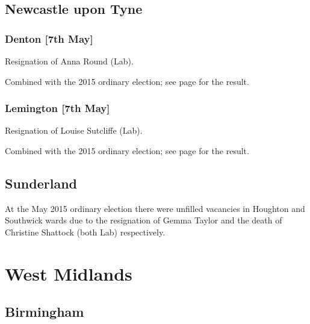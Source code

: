 \documentclass[a4paper,openany]{book}
\begin{document}
\begin{resultsiii}
\subsection*{Newcastle upon Tyne}

\subsubsection*{Denton \hspace*{\fill}\nolinebreak[1]%
\enspace\hspace*{\fill}
[7th May]}


Resignation of Anna Round (Lab).

Combined with the 2015 ordinary election; see page \pageref{DentonNewcastleTyne} for the result.

\subsubsection*{Lemington \hspace*{\fill}\nolinebreak[1]%
\enspace\hspace*{\fill}
[7th May]}


Resignation of Louise Sutcliffe (Lab).

Combined with the 2015 ordinary election; see page \pageref{LemingtonNewcastleTyne} for the result.

\subsection*{Sunderland}

At the May 2015 ordinary election there were unfilled vacancies in Houghton and Southwick wards due to the resignation of Gemma Taylor and the death of Christine Shattock (both Lab) respectively.

\section{West Midlands}

\subsection*{Birmingham}


\end{resultsiii}
\end{document}
